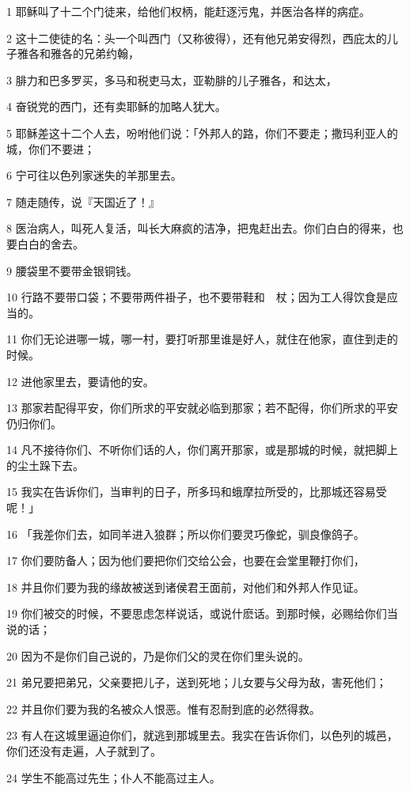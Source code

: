 \par 1 耶稣叫了十二个门徒来，给他们权柄，能赶逐污鬼，并医治各样的病症。
\par 2 这十二使徒的名：头一个叫西门（又称彼得），还有他兄弟安得烈，西庇太的儿子雅各和雅各的兄弟约翰，
\par 3 腓力和巴多罗买，多马和税吏马太，亚勒腓的儿子雅各，和达太，
\par 4 奋锐党的西门，还有卖耶稣的加略人犹大。
\par 5 耶稣差这十二个人去，吩咐他们说：「外邦人的路，你们不要走；撒玛利亚人的城，你们不要进；
\par 6 宁可往以色列家迷失的羊那里去。
\par 7 随走随传，说『天国近了！』
\par 8 医治病人，叫死人复活，叫长大麻疯的洁净，把鬼赶出去。你们白白的得来，也要白白的舍去。
\par 9 腰袋里不要带金银铜钱。
\par 10 行路不要带口袋；不要带两件褂子，也不要带鞋和　杖；因为工人得饮食是应当的。
\par 11 你们无论进哪一城，哪一村，要打听那里谁是好人，就住在他家，直住到走的时候。
\par 12 进他家里去，要请他的安。
\par 13 那家若配得平安，你们所求的平安就必临到那家；若不配得，你们所求的平安仍归你们。
\par 14 凡不接待你们、不听你们话的人，你们离开那家，或是那城的时候，就把脚上的尘土跺下去。
\par 15 我实在告诉你们，当审判的日子，所多玛和蛾摩拉所受的，比那城还容易受呢！」
\par 16 「我差你们去，如同羊进入狼群；所以你们要灵巧像蛇，驯良像鸽子。
\par 17 你们要防备人；因为他们要把你们交给公会，也要在会堂里鞭打你们，
\par 18 并且你们要为我的缘故被送到诸侯君王面前，对他们和外邦人作见证。
\par 19 你们被交的时候，不要思虑怎样说话，或说什麽话。到那时候，必赐给你们当说的话；
\par 20 因为不是你们自己说的，乃是你们父的灵在你们里头说的。
\par 21 弟兄要把弟兄，父亲要把儿子，送到死地；儿女要与父母为敌，害死他们；
\par 22 并且你们要为我的名被众人恨恶。惟有忍耐到底的必然得救。
\par 23 有人在这城里逼迫你们，就逃到那城里去。我实在告诉你们，以色列的城邑，你们还没有走遍，人子就到了。
\par 24 学生不能高过先生；仆人不能高过主人。
